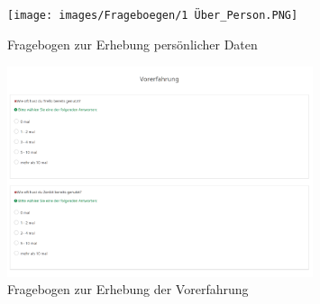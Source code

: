 





\begin{figure}[H]
    \texttt{[image: images/Frageboegen/1 Über\_Person.PNG]}
    \centering
    \caption{Fragebogen zur Erhebung persönlicher Daten}
    \label{fig:person}
\end{figure}

\begin{figure}[H]
    \includegraphics[width=0.8\textwidth]{images/Frageboegen/2 Vorerfahrung.PNG}
    \centering
    \caption{Fragebogen zur Erhebung der Vorerfahrung}
    \label{fig:vorerfahrung}
\end{figure}

